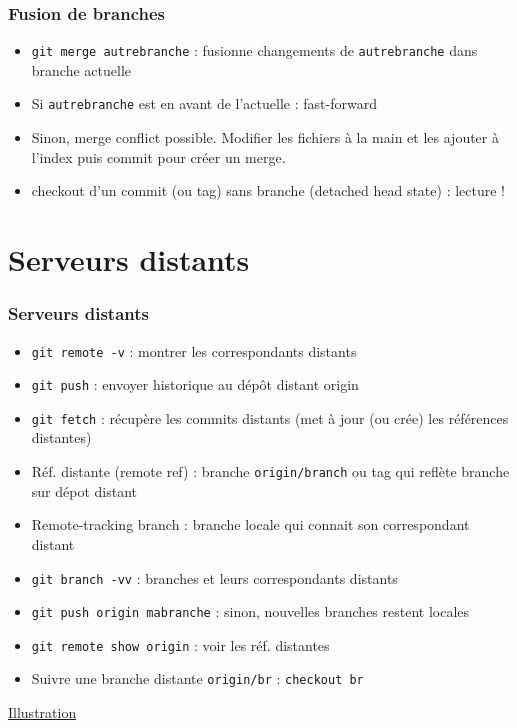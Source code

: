 \documentclass[english, french]{beamer}
\begin{document}
\begin{frame}
	\frametitle{Fusion de branches}
	{
	\centering
	\par
	}
	\begin{itemize}
		\item \texttt{git merge autrebranche} : fusionne changements de \texttt{autrebranche} dans branche actuelle
		\item Si \texttt{autrebranche} est en avant de l’actuelle : \og{}fast-forward\fg{}
		\item Sinon, \og{}merge conflict\fg{} possible. Modifier les fichiers à la main et les ajouter à l’index puis commit pour créer un merge. 
		\item checkout d’un commit {\tiny (ou tag)} sans branche {\tiny (detached head state)} : lecture !
	\end{itemize}
\end{frame}

\section{Serveurs distants}
\begin{frame}
	\frametitle{Serveurs distants}
	\begin{itemize}
		\item \texttt{git remote -v} : montrer les correspondants distants
		\item \texttt{git push} : envoyer historique au dépôt distant origin
		\item \texttt{git fetch} : récupère les commits distants (met à jour (ou crée) les références distantes)
		\item Réf. distante (\og{}remote ref\fg{}) : branche \texttt{origin/branch} {\tiny ou tag} qui reflète branche sur dépot distant
		\item \og{}Remote-tracking branch\fg{} : branche locale qui connait son correspondant distant
		\item \texttt{git branch -vv} : branches et leurs correspondants distants
		\item \texttt{git push origin mabranche} : sinon, nouvelles branches restent locales
		\item \texttt{git remote show origin} : voir les réf. distantes
		\item Suivre une branche distante \texttt{origin/br} : \texttt{checkout br}
	\end{itemize}
	\href{https://onlywei.github.io/explain-git-with-d3/\#fetch}{Illustration}
\end{frame}
\end{document}
